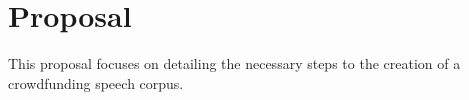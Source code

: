 \chapter[Proposal]{Proposal}

This proposal focuses on detailing the necessary steps to the creation of a crowdfunding speech corpus.

\section{}